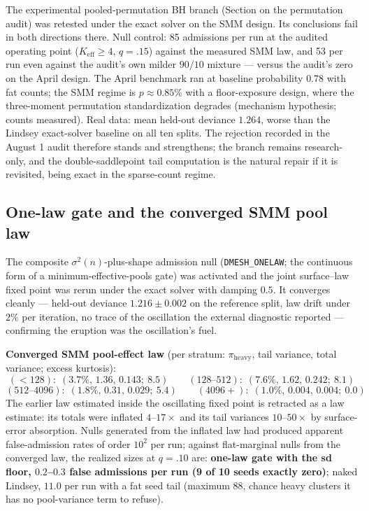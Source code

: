 \documentclass[11pt]{article}
\begin{document}
The experimental pooled-permutation BH branch (Section on the permutation
audit) was retested under the exact solver on the SMM design. Its
conclusions fail in both directions there. Null control: 85 admissions per
run at the audited operating point ($K_{\mathrm{eff}}\ge 4$, $q{=}.15$)
against the measured SMM law, and 53 per run even against the audit's own
milder $90/10$ mixture --- versus the audit's zero on the April design.
The April benchmark ran at baseline probability $0.78$ with fat counts;
the SMM regime is $p\approx 0.85\%$ with a floor-exposure design, where the
three-moment permutation standardization degrades (mechanism hypothesis;
counts measured). Real data: mean held-out deviance $1.264$, worse than the
Lindsey exact-solver baseline on all ten splits. The rejection recorded in
the August 1 audit therefore stands and strengthens; the branch remains
research-only, and the double-saddlepoint tail computation is the natural
repair if it is revisited, being exact in the sparse-count regime.

\subsection{One-law gate and the converged SMM pool law}

The composite $\sigma^2(n)$-plus-shape admission null
(\texttt{DMESH\_ONELAW}; the continuous form of a minimum-effective-pools
gate) was activated and the joint surface--law fixed point was rerun under
the exact solver with damping $0.5$. It converges cleanly --- held-out
deviance $1.216\pm 0.002$ on the reference split, law drift under $2\%$ per
iteration, no trace of the oscillation the external diagnostic reported ---
confirming the eruption was the oscillation's fuel.

\textbf{Converged SMM pool-effect law} (per stratum: $\pi_{\mathrm{heavy}}$,
tail variance, total variance; excess kurtosis):
\[
(<128):\;(3.7\%,\,1.36,\,0.143;\ 8.5)\qquad
(128\text{--}512):\;(7.6\%,\,1.62,\,0.242;\ 8.1)
\]
\[
(512\text{--}4096):\;(1.8\%,\,0.31,\,0.029;\ 5.4)\qquad
(4096+):\;(1.0\%,\,0.004,\,0.004;\ 0.0)
\]
The earlier law estimated inside the oscillating fixed point is retracted as
a law estimate: its totals were inflated $4$--$17\times$ and its tail
variances $10$--$50\times$ by surface-error absorption. Nulls generated from
the inflated law had produced apparent false-admission rates of order $10^2$
per run; against flat-marginal nulls from the converged law, the realized
sizes at $q{=}.10$ are: \textbf{one-law gate with the sd floor, $0.2$--$0.3$
false admissions per run (9 of 10 seeds exactly zero)}; naked Lindsey,
$11.0$ per run with a fat seed tail (maximum 88, chance heavy clusters it
has no pool-variance term to refuse).
\end{document}
